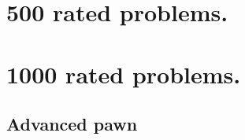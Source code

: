 \documentclass{book}
\begin{document}

 

\tableofcontents
\newpage

\chapter{500 rated problems.}
\chapter{1000 rated problems.}
\newpage 
\section{Advanced pawn}
\end{document}

